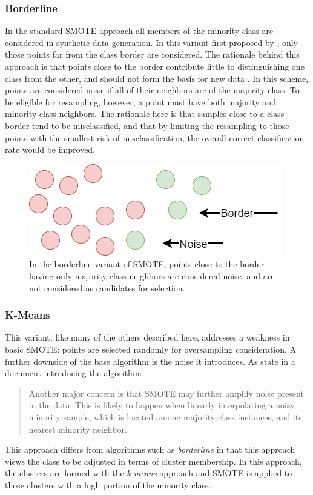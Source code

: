 \documentclass[letterpaper]{report}
\begin{document}
\subsubsection{Borderline}
In the standard SMOTE approach all members of the minority class are considered in synthetic data generation. In this variant first proposed by \citeauthor{Han2005-ui}, only those points far from the class border are considered. The rationale behind this approach is that points close to the border contribute little to distinguishing one class from the other, and should not form the basis for new data \cite{Han2005-ui}. In this scheme, points are considered noise if all of their neighbors are of the majority class. To be eligible for resampling, however, a point must have both majority and minority class neighbors. The rationale here is that samples close to a class border tend to be misclassified, and that by limiting the resampling to those points with the smallest risk of misclassification, the overall correct classification rate would be improved.
\begin{figure}[H]
	\centering
	\includegraphics[scale=0.30]{./figures/borderline.png}
	\caption[Borderline selection of synthetic data points]{In the borderline variant of SMOTE, points close to the border having only majority class neighbors are considered noise, and are not considered as candidates for selection. }
	\label{fig:borderline}
\end{figure}
%
%


\subsubsection{K-Means}
This variant, like many of the others described here, addresses a weakness in basic SMOTE: points are selected randomly for oversampling consideration. A further downside of the base algorithm is the noise it introduces. As \citeauthor{Last2017-rh} state in a document introducing the algorithm:
\begin{quote}
Another major concern is that SMOTE may further amplify noise present in the data. This is likely
to happen when linearly interpolating a noisy minority sample, which is located among majority class
instances, and its nearest minority neighbor. \parencite{Last2017-rh}
\end{quote}
This approach differs from algorithms such as \textit{borderline} in that this approach views the class to be adjusted in terms of cluster membership.  In this approach, the clusters are formed with the \textit{k-means} approach and SMOTE is applied to those clusters with a high portion of the minority class.
\end{document}

